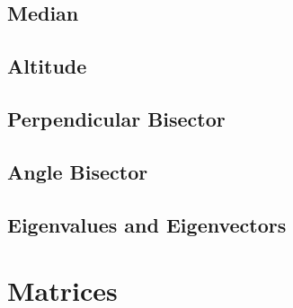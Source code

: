 \documentclass[journal]{IEEEtran}
\begin{document}
\subsection{Median}

\subsection{Altitude}

\subsection{Perpendicular Bisector}

\subsection{Angle Bisector}

\subsection{Eigenvalues and Eigenvectors}

\section{Matrices}


%

\end{document}
